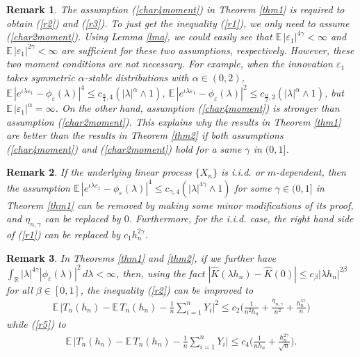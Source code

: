 \documentclass[11pt]{article}
\newtheorem{remark}{Remark}[section]
\def\R{{\mathbb R}}
\def\E{{{\mathbb E}\,}}
\begin{document}
\begin{remark} \label{rmk2} The assumption (\ref{char4moment}) in Theorem \ref{thm1} is required to obtain (\ref{r2}) and (\ref{r3}). To just get the inequality (\ref{r1}), we only need to assume 
(\ref{char2moment}).  Using Lemma \ref{lma}, we could easily see that $\E|\varepsilon_1|^{4\gamma}<\infty$ and $\E|\varepsilon_1|^{2\gamma}<\infty$ are sufficient for these two assumptions, respectively. However, these two moment conditions are not necessary. For example, when the innovation $\varepsilon_1$ takes symmetric $\alpha$-stable distributions with $\alpha\in(0,2)$,  $\E|e^{\iota \lambda \varepsilon_1}-\phi_{\varepsilon}(\lambda)|^{4}\leq c_{\frac{\alpha}{4},4} \left(|\lambda|^{\alpha}\wedge 1\right)$, $\E|e^{\iota \lambda \varepsilon_1}-\phi_{\varepsilon}(\lambda)|^{2}\leq c_{\frac{\alpha}{2},2} \left(|\lambda|^{\alpha}\wedge 1\right)$, but $\E|\varepsilon_1|^{\alpha}=\infty$. On the other hand, assumption (\ref{char4moment}) is stronger than assumption (\ref{char2moment}). This explains why the results in Theorem \ref{thm1} are better than the results in Theorem \ref{thm2} if both assumptions (\ref{char4moment}) and (\ref{char2moment}) hold for a same $\gamma$ in $(0,1]$. 
\end{remark}

\begin{remark}\label{rmk3} If the underlying linear process $\{X_n\}$ is i.i.d. or $m$-dependent, then the assumption $\E|e^{\iota \lambda \varepsilon_1}-\phi_{\varepsilon}(\lambda)|^{4}\leq c_{\gamma,4} \left(|\lambda|^{4\gamma}\wedge 1\right)$ for some $\gamma\in(0,1]$ in Theorem \ref{thm1} can be removed by making some minor modifications of its proof, and $\eta_{n,\gamma}$ can be replaced by $0$. Furthermore, for the i.i.d. case, the right hand side of (\ref{r1}) can be replaced by $c_1h^{2\gamma}_n$.
\end{remark}

\begin{remark}\label{rmk4} In Theorems \ref{thm1} and \ref{thm2}, if we further have $\int_{\R}|\lambda|^{4\gamma} |\phi_{\varepsilon}(\lambda)|^2\, d\lambda<\infty$, then, using the fact $|\widehat{K}(\lambda h_n)-\widehat{K}(0)|\leq c_{\beta}|\lambda h_n|^{2\beta}$ for all $\beta\in[0,1]$,  the inequality (\ref{r2}) can be improved to  
\begin{align*} 
\E\Big|T_n(h_n)-\E T_n(h_n)-\frac{1}{n}\sum^n_{i=1}Y_i\Big|^2 \leq c_2 \Big(\frac{1}{n^2h_n}+\frac{\eta_{n,\gamma}}{n^2}+\frac{h^{4\gamma}_n}{n}\Big)
\end{align*}
while (\ref{r5}) to
\begin{align*} 
\E\Big|T_n(h_n)-\E T_n(h_n)-\frac{1}{n}\sum^n_{i=1}Y_i\Big| \leq c_4 \Big(\frac{1}{nh_n}+\frac{h^{2\gamma}_n}{\sqrt{n}}\Big).
\end{align*}
\end{remark}
\end{document}
